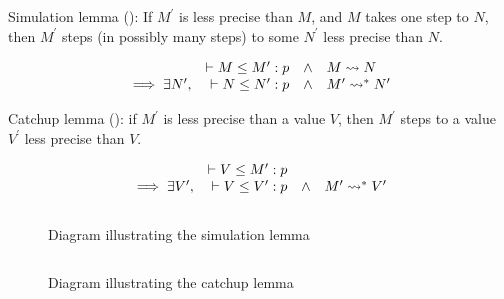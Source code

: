 Simulation lemma (): If $M^\prime$ is less precise than $M$, and $M$ takes one step to $N$,
then $M^\prime$ steps (in possibly many steps) to some $N^\prime$ less precise than $N$.

\[
\begin{array}{rrcl}
  & \vdash M \le M^\prime : p & \wedge & M \rightsquigarrow N
\\ \implies \exists N^\prime , & \vdash N \le N^\prime : p & \wedge & M^\prime \rightsquigarrow^\ast N^\prime
\end{array}
\]

Catchup lemma (): if $M^\prime$ is less precise than a value $V$, then $M^\prime$ steps
to a value $V^\prime$ less precise than $V$.

\[
\begin{array}{rrcl}
  & \vdash V \le M^\prime : p & &
\\ \implies \exists V^\prime , & \vdash V \le V^\prime : p & \wedge & M^\prime \rightsquigarrow^\ast V^\prime
\end{array}
\]

\begin{figure}
$$

$$
\caption{Diagram illustrating the simulation lemma}
\label{fig:sim}
\end{figure}

\begin{figure}
$$  $$
\caption{Diagram illustrating the catchup lemma}
\label{fig:catchup}
\end{figure}
